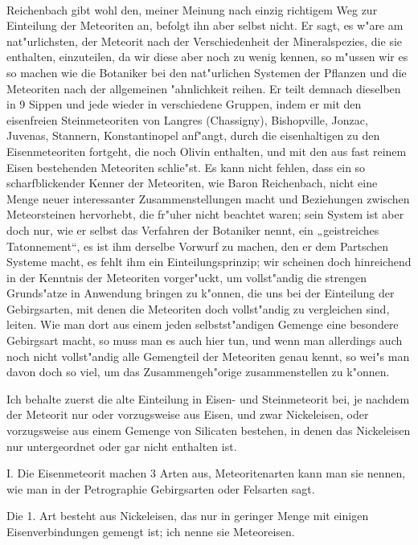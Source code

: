 \documentclass[a4paper, 11pt, oneside, german]{article}
\begin{document}
\paragraph{}
Reichenbach gibt wohl den, meiner Meinung nach einzig richtigem Weg zur Einteilung der Meteoriten an, befolgt ihn aber selbst nicht. Er sagt, es w"are am nat"urlichsten, der Meteorit nach der Verschiedenheit der Mineralspezies, die sie enthalten, einzuteilen, da wir diese aber noch zu wenig kennen, so m"ussen wir es so machen wie die Botaniker bei den nat"urlichen Systemen der Pflanzen und die Meteoriten nach der allgemeinen "ahnlichkeit reihen. Er teilt demnach dieselben in 9 Sippen und jede wieder in verschiedene Gruppen, indem er mit den eisenfreien Steinmeteoriten von Langres (Chassigny), Bishopville, Jonzac, Juvenas, Stannern, Konstantinopel anf"angt, durch die eisenhaltigen zu den Eisenmeteoriten fortgeht, die noch Olivin enthalten, und mit den aus fast reinem Eisen bestehenden Meteoriten schlie"st. Es kann nicht fehlen, dass ein so scharfblickender Kenner der Meteoriten, wie Baron Reichenbach, nicht eine Menge neuer interessanter Zusammenstellungen macht und Beziehungen zwischen Meteorsteinen hervorhebt, die fr"uher nicht beachtet waren; sein System ist aber doch nur, wie er selbst das Verfahren der Botaniker nennt, ein „geistreiches Tatonnement“, es ist ihm derselbe Vorwurf zu machen, den er dem Partschen Systeme macht, es fehlt ihm ein Einteilungsprinzip; wir scheinen doch hinreichend in der Kenntnis der Meteoriten vorger"uckt, um vollst"andig die strengen Grunds"atze in Anwendung bringen zu k"onnen, die uns bei der Einteilung der Gebirgsarten, mit denen die Meteoriten doch vollst"andig zu vergleichen sind, leiten. Wie man dort aus einem jeden selbstst"andigen Gemenge eine besondere Gebirgsart macht, so muss man es auch hier tun, und wenn man allerdings auch noch nicht vollst"andig alle Gemengteil der Meteoriten genau kennt, so wei"s man davon doch so viel, um das Zusammengeh"orige zusammenstellen zu k"onnen.

Ich behalte zuerst die alte Einteilung in Eisen- und Steinmeteorit bei, je nachdem der Meteorit nur oder vorzugsweise aus Eisen, und zwar Nickeleisen, oder vorzugsweise aus einem Gemenge von Silicaten bestehen, in denen das Nickeleisen nur untergeordnet oder gar nicht enthalten ist.

I. Die Eisenmeteorit machen 3 Arten aus, Meteoritenarten kann man sie nennen, wie man in der Petrographie Gebirgsarten oder Felsarten sagt.

Die 1. Art besteht aus Nickeleisen, das nur in geringer Menge mit einigen Eisenverbindungen gemengt ist; ich nenne sie Meteoreisen.
\end{document}
